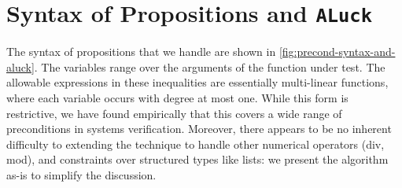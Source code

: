\documentclass[sigconf,nonacm,review,anonymous]{acmart}
\begin{document}


\section{Syntax of Propositions and \texttt{ALuck}}
\label{sec:luck}

The syntax of propositions that we handle are shown in
\autoref{fig:precond-syntax-and-aluck}. The variables range over
the arguments of the function under test. The allowable expressions in these inequalities are
essentially multi-linear functions, where each variable occurs with degree at
most one. While this form is restrictive, we have found empirically that this covers
a wide range of preconditions in systems verification. Moreover, there
appears to be no inherent difficulty to extending the technique to handle
other numerical operators (div, mod), and constraints over structured types like lists: we present the algorithm as-is to
simplify the discussion.
\end{document}
